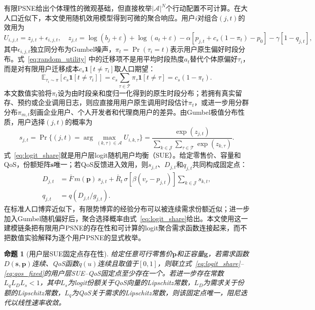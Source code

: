 \documentclass[UTF8,11pt]{ctexart}
\newtheorem{proposition}{命题}
\newcommand{\qos}{q}
\newcommand{\T}{\mathcal{T}}
\newcommand{\J}{\mathcal{J}}
\newcommand{\A}{\mathcal{A}}
\newcommand{\D}{D}
\newcommand{\p}{\boldsymbol{p}}
\newcommand{\g}{\boldsymbol{g}}
\begin{document}
有限PSNE给出个体理性的微观基础，但直接枚举$|\A|^N$个行动配置不可计算。在大人口近似下，本文使用随机效用模型得到可微的聚合响应。用户$i$对组合$(j,t)$的效用为
\begin{equation}
  U_{i,j,t}=z_{j,t}+\epsilon_{i,j,t},
  \quad
  z_{j,t}=\log(b_j+\varepsilon)+\log(a_t+\varepsilon)
  -\alpha\left[p_{j,t}+c_s(1-\pi_t)-p_0\right]
  -\gamma[1-q_{j,t}],
  \label{eq:random_utility}
\end{equation}
其中$\epsilon_{i,j,t}$独立同分布为Gumbel噪声，$\pi_t=\Pr(\tau_i=t)$表示用户原生偏好时段分布。式~\eqref{eq:random_utility} 中的迁移项不是用平均时段热度$a_t$替代个体原偏好$\tau_i$，而是对有限用户迁移成本$c_s\mathbf{1}[t\ne\tau_i]$取人口期望：
\begin{equation}
  \mathbb{E}_{\tau_i\sim\pi}\!\left[c_s\mathbf{1}[t\ne\tau_i]\right]
  =c_s\sum_{\tau\in\T}\pi_\tau\mathbf{1}[t\ne\tau]
  =c_s(1-\pi_t).
  \label{eq:aggregate_switch_cost}
\end{equation}
本文数值实验将$\pi_t$设为由时段亲和度归一化得到的原生时段分布；若拥有真实留存、预约或企业调用日志，则应直接用用户原生调用时段估计$\pi_t$，或进一步用分群分布$\pi_{m,t}$刻画企业用户、个人开发者和代理商用户的差异。由Gumbel极值分布性质，用户选择$(j,t)$的概率为
\begin{equation}
  s_{j,t}=\Pr\{(j,t)=\arg\max_{(k,\tau)\in\A}U_{i,k,\tau}\}
  =\frac{\exp(z_{j,t})}{\sum_{k\in\J}\sum_{\tau\in\T}\exp(z_{k,\tau})}.
  \label{eq:logit_share}
\end{equation}
式~\eqref{eq:logit_share}就是用户层logit随机用户均衡（SUE）。给定零售价、容量和QoS，份额矩阵$\boldsymbol{s}$唯一；若QoS反馈进入效用，则$s_{j,t}$、$\D_{j,t}$和$q_{j,t}$共同构成固定点：
\begin{align}
  \D_{j,t}&=\bar F\,m(\p)\,s_{j,t}
  +\bar R_t\,\sigma[\beta(v_r-p_{j,t})]\sum_{k\in\J}s_{k,t}, \label{eq:demand}\\
  q_{j,t}&=\qos(\D_{j,t}/g_{j,t}). \label{eq:qos_fixed}
\end{align}
在标准人口博弈近似下，有限势博弈的经验分布可以被连续需求份额近似；进一步加入Gumbel随机偏好后，聚合选择概率由式~\eqref{eq:logit_share}给出。本文使用这一建模链条把有限用户PSNE的存在性和可计算的logit聚合需求函数连接起来，而不把数值实验解释为逐个用户PSNE的显式枚举。

\begin{proposition}[用户层SUE固定点存在性]
\label{prop:sue_fixed_point}
给定任意可行零售价$\p$和正容量$\g$，若需求函数$\D(\boldsymbol{s},\p)$连续、QoS函数$\qos(u)$连续且取值于$[0,1]$，则联立式~\eqref{eq:logit_share}--\eqref{eq:qos_fixed}的用户层SUE--QoS固定点至少存在一个。若进一步存在常数$L_\qos L_D L_s<1$，其中$L_s$为logit份额关于QoS向量的Lipschitz常数，$L_D$为需求关于份额的Lipschitz常数，$L_\qos$为QoS关于需求的Lipschitz常数，则该固定点唯一，阻尼迭代以线性速率收敛。
\end{proposition}
\end{document}
